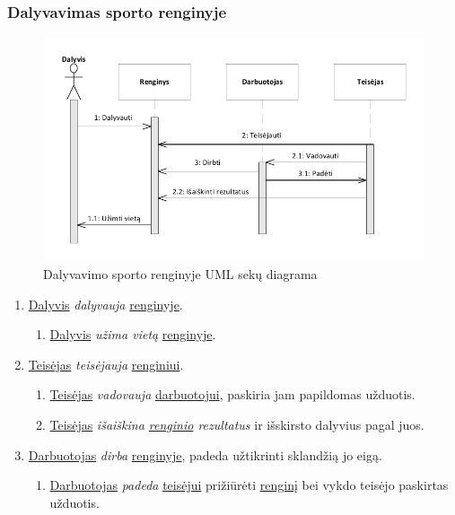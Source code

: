 \documentclass{VUMIFPSkursinis}
\begin{document}
    \subsubsection*{Dalyvavimas sporto renginyje}
      \begin{figure}[H]
        \centering
        \includegraphics[width=\textwidth]{img/SekuDiagrama4}
        \caption{Dalyvavimo sporto renginyje UML sekų diagrama}
        \label{fig:dalyvavimoSekuDiagrama}
      \end{figure}
      \begin{enumerate}
        \item \underline{Dalyvis} \textit{dalyvauja} \underline{renginyje}.
          \begin{enumerate}
            \item\underline{Dalyvis} \textit{užima vietą} \underline{renginyje}.  
          \end{enumerate}
        \item \underline{Teisėjas} \textit{teisėjauja} \underline{renginiui}.
          \begin{enumerate}
            \item\underline{Teisėjas} \textit{vadovauja} \underline {darbuotojui}, paskiria jam papildomas užduotis.
            \item\underline{Teisėjas} \textit{išaiškina \underline{renginio} rezultatus} ir išskirsto dalyvius pagal juos.
            \end{enumerate}
        \item \underline{Darbuotojas} \textit{dirba} \underline{renginyje}, padeda užtikrinti sklandžią jo eigą.
          \begin{enumerate}
            \item\underline{Darbuotojas} \textit{padeda} \underline{teisėjui} prižiūrėti \underline{renginį} bei vykdo teisėjo paskirtas užduotis.
          \end{enumerate}
      \end{enumerate}
\end{document}
